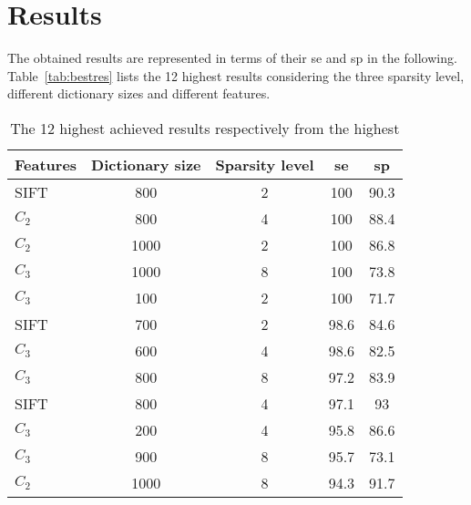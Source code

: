 \section{Results}
\label{sec:res}
The obtained results are represented in terms of their \ac{se} and \ac{sp} in the following. Table~\ref{tab:bestres} lists the 12 highest results considering the three sparsity level, different dictionary sizes and different features.
 
\begin{table*}
\caption{The 12 highest achieved results respectively from the highest}
\centering
\begin{tabular}{l cccc}
\toprule
Features &  Dictionary size & Sparsity level & \ac{se} & \ac{sp}\\
\midrule
SIFT    & 800 & 2 & 100 & 90.3\\
$C_{2}$ & 800 & 4 & 100 & 88.4\\
$C_{2}$ & 1000 & 2 & 100 & 86.8\\
$C_{3}$ & 1000 & 8 & 100 & 73.8 \\
$C_{3}$ & 100 & 2 & 100 & 71.7 \\
SIFT    & 700 & 2 & 98.6 & 84.6 \\
$C_{3}$ & 600 & 4 & 98.6 & 82.5\\
$C_{3}$ & 800 & 8 & 97.2 & 83.9\\
SIFT    & 800 & 4 & 97.1 & 93 \\
$C_{3}$ & 200 & 4 & 95.8 & 86.6\\
$C_{3}$ & 900 & 8 & 95.7 & 73.1 \\
$C_{2}$ & 1000 & 8 & 94.3 & 91.7\\
\bottomrule
\end{tabular}
\label{tab:tab1}
\end{table*}
